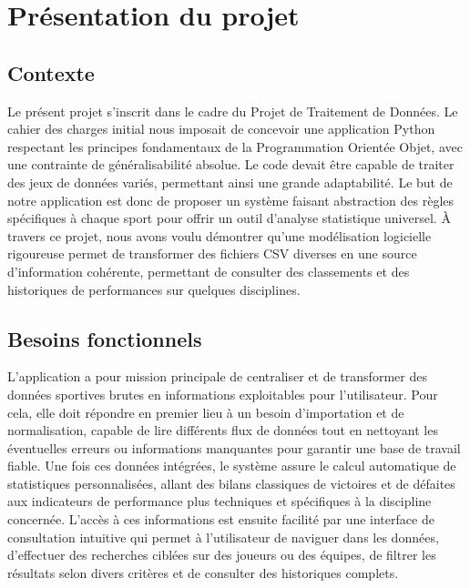 \documentclass[
  french,
  letterpaper,
  DIV=11,
  numbers=noendperiod]{scrartcl}
\begin{document}
\newpage

\section{Présentation du projet}\label{pruxe9sentation-du-projet}

\subsection{Contexte}\label{contexte}

Le présent projet s'inscrit dans le cadre du Projet de Traitement de
Données. Le cahier des charges initial nous imposait de concevoir une
application Python respectant les principes fondamentaux de la
Programmation Orientée Objet, avec une contrainte de généralisabilité
absolue. Le code devait être capable de traiter des jeux de données
variés, permettant ainsi une grande adaptabilité. Le but de notre
application est donc de proposer un système faisant abstraction des
règles spécifiques à chaque sport pour offrir un outil d'analyse
statistique universel. À travers ce projet, nous avons voulu démontrer
qu'une modélisation logicielle rigoureuse permet de transformer des
fichiers CSV diverses en une source d'information cohérente, permettant
de consulter des classements et des historiques de performances sur
quelques disciplines.

\subsection{Besoins fonctionnels}\label{besoins-fonctionnels}

L'application a pour mission principale de centraliser et de transformer
des données sportives brutes en informations exploitables pour
l'utilisateur. Pour cela, elle doit répondre en premier lieu à un besoin
d'importation et de normalisation, capable de lire différents flux de
données tout en nettoyant les éventuelles erreurs ou informations
manquantes pour garantir une base de travail fiable. Une fois ces
données intégrées, le système assure le calcul automatique de
statistiques personnalisées, allant des bilans classiques de victoires
et de défaites aux indicateurs de performance plus techniques et
spécifiques à la discipline concernée. L'accès à ces informations est
ensuite facilité par une interface de consultation intuitive qui permet
à l'utilisateur de naviguer dans les données, d'effectuer des recherches
ciblées sur des joueurs ou des équipes, de filtrer les résultats selon
divers critères et de consulter des historiques complets.
\end{document}

